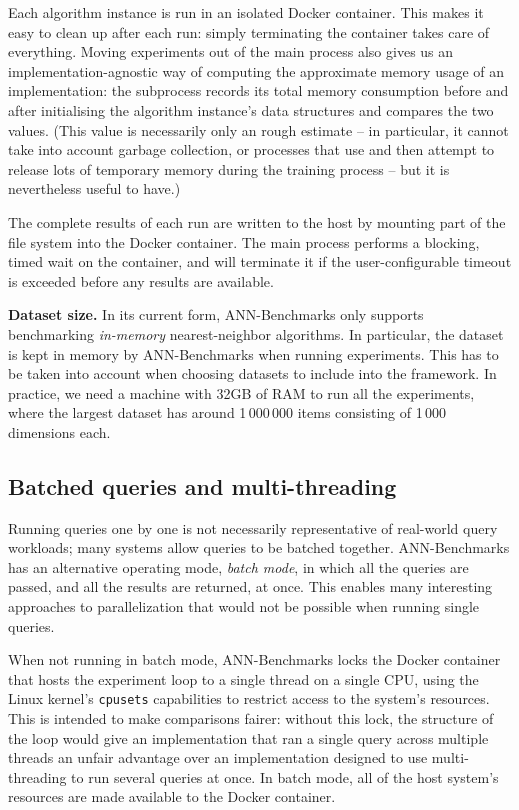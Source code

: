 Each algorithm instance is run in an isolated Docker container. This makes it
easy to clean up after each run: simply terminating the container 
takes care of everything. Moving experiments out of the main process
also gives us an
implementation-agnostic way of computing the approximate memory usage of an
implementation:
the subprocess records its total memory consumption before and after
initialising the algorithm instance's data structures and compares the two
values. (This value is necessarily only an rough estimate -- in particular,
it cannot take into account garbage collection, or processes that use and then
attempt to release lots of temporary memory during the training process -- but
it is nevertheless useful to have.)

The complete results of each run are written to the host by mounting
part of the file system into the Docker container. The main process performs a
blocking, timed wait on the container, and will terminate it if
the user-configurable timeout is exceeded before any results are available.


\medskip

\noindent\textbf{Dataset size.} In its current form, ANN-Benchmarks
only supports
benchmarking \emph{in-memory} nearest-neighbor algorithms. In particular, the dataset is kept 
in memory by ANN-Benchmarks when running experiments. This has to be taken into account when choosing datasets to include into the framework. In practice, we need a machine with 32GB of RAM to run all the experiments, where the largest dataset has around 1\,000\,000 items consisting of 1\,000 dimensions each.

\subsection{Batched queries and multi-threading}
\label{system:mtbatch}

Running queries one by one is not necessarily representative of real-world
query workloads; many systems allow queries to be batched together.
ANN-Benchmarks has an alternative operating mode, \emph{batch mode}, in which
all the queries are passed, and all the results are returned, at once.
This enables many interesting approaches to parallelization that would not be
possible when running single queries.

When not running in batch mode, ANN-Benchmarks locks the Docker container that
hosts the experiment loop to a single thread on a single CPU, using the Linux
kernel's \texttt{cpusets} capabilities to restrict access to the system's
resources. This is intended to make comparisons fairer: without this lock,
the structure of the loop would give an implementation that ran a single
query across multiple threads an unfair advantage over an implementation
designed to use multi-threading to run several queries at once. In batch mode,
all of the host system's resources are made available to the Docker container.

